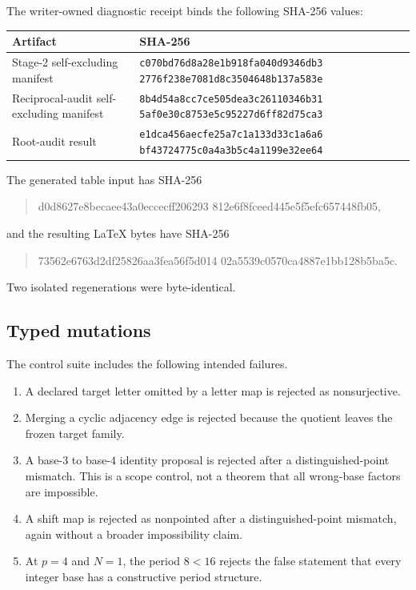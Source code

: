 The writer-owned diagnostic receipt binds the following SHA-256 values:
\begin{center}
\small
\begin{tabularx}{\textwidth}{@{}>{\raggedright\arraybackslash}p{}X@{}}
\toprule
Artifact & SHA-256 \\
\midrule
Stage-2 self-excluding manifest
& \texttt{c070bd76d8a28e1b918fa040d9346db3}\newline
  \texttt{2776f238e7081d8c3504648b137a583e} \\
Reciprocal-audit self-excluding manifest
& \texttt{8b4d54a8cc7ce505dea3c26110346b31}\newline
  \texttt{5af0e30c8753e5c95227d6ff82d75ca3} \\
Root-audit result
& \texttt{e1dca456aecfe25a7c1a133d33c1a6a6}\newline
  \texttt{bf43724775c0a4a3b5c4a1199e32ee64} \\
\bottomrule
\end{tabularx}
\end{center}
The generated table input has SHA-256
\begin{quote}\ttfamily\footnotesize
d0d8627e8becaee43a0eccecff206293\newline
812e6f8fceed445e5f5efc657448fb05,
\end{quote}
and the resulting LaTeX bytes have SHA-256
\begin{quote}\ttfamily\footnotesize
73562e6763d2df25826aa3fea56f5d014\newline
02a5539c0570ca4887e1bb128b5ba5c.
\end{quote}
Two isolated regenerations were byte-identical.

\subsection{Typed mutations}

The control suite includes the following intended failures.
\begin{enumerate}[leftmargin=2.2em]
  \item A declared target letter omitted by a letter map is rejected as
    nonsurjective.
  \item Merging a cyclic adjacency edge is rejected because the quotient
    leaves the frozen target family.
  \item A base-$3$ to base-$4$ identity proposal is rejected after a
    distinguished-point mismatch.  This is a scope control, not a theorem
    that all wrong-base factors are impossible.
  \item A shift map is rejected as nonpointed after a distinguished-point
    mismatch, again without a broader impossibility claim.
  \item At $p=4$ and $N=1$, the period $8<16$ rejects the false statement
    that every integer base has a constructive period structure.
\end{enumerate}

